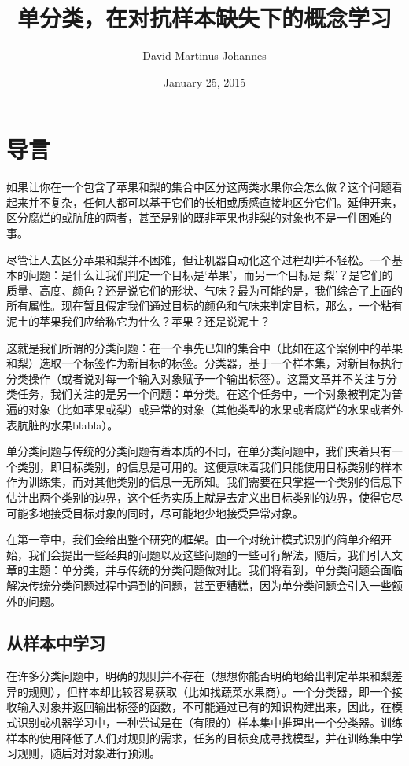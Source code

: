 \documentclass{ctexrep}
\begin{document}
\title{单分类，在对抗样本缺失下的概念学习}
\author{David Martinus Johannes}
\date{January 25, 2015}
\maketitle
\chapter{导言}
如果让你在一个包含了苹果和梨的集合中区分这两类水果你会怎么做？这个问题看起来并不复杂，任何人都可以基于它们的长相或质感直接地区分它们。延伸开来，区分腐烂的或肮脏的两者，甚至是别的既非苹果也非梨的对象也不是一件困难的事。

尽管让人去区分苹果和梨并不困难，但让机器自动化这个过程却并不轻松。一个基本的问题：是什么让我们判定一个目标是‘苹果’，而另一个目标是‘梨’？是它们的质量、高度、颜色？还是说它们的形状、气味？最为可能的是，我们综合了上面的所有属性。现在暂且假定我们通过目标的颜色和气味来判定目标，那么，一个粘有泥土的苹果我们应给称它为什么？苹果？还是说泥土？

这就是我们所谓的分类问题：在一个事先已知的集合中（比如在这个案例中的苹果和梨）选取一个标签作为新目标的标签。分类器，基于一个样本集，对新目标执行分类操作（或者说对每一个输入对象赋予一个输出标签）。这篇文章并不关注与分类任务，我们关注的是另一个问题：单分类。在这个任务中，一个对象被判定为普遍的对象（比如苹果或梨）或异常的对象（其他类型的水果或者腐烂的水果或者外表肮脏的水果blabla）。

单分类问题与传统的分类问题有着本质的不同，在单分类问题中，我们夹着只有一个类别，即目标类别，的信息是可用的。这便意味着我们只能使用目标类别的样本作为训练集，而对其他类别的信息一无所知。我们需要在只掌握一个类别的信息下估计出两个类别的边界，这个任务实质上就是去定义出目标类别的边界，使得它尽可能多地接受目标对象的同时，尽可能地少地接受异常对象。

在第一章中，我们会给出整个研究的框架。由一个对统计模式识别的简单介绍开始，我们会提出一些经典的问题以及这些问题的一些可行解法，随后，我们引入文章的主题：单分类，并与传统的分类问题做对比。我们将看到，单分类问题会面临解决传统分类问题过程中遇到的问题，甚至更糟糕，因为单分类问题会引入一些额外的问题。

\section{从样本中学习}
在许多分类问题中，明确的规则并不存在（想想你能否明确地给出判定苹果和梨差异的规则），但样本却比较容易获取（比如找蔬菜水果商）。一个分类器，即一个接收输入对象并返回输出标签的函数，不可能通过已有的知识构建出来，因此，在模式识别或机器学习中，一种尝试是在（有限的）样本集中推理出一个分类器。训练样本的使用降低了人们对规则的需求，任务的目标变成寻找模型，并在训练集中学习规则，随后对对象进行预测。
\end{document}
